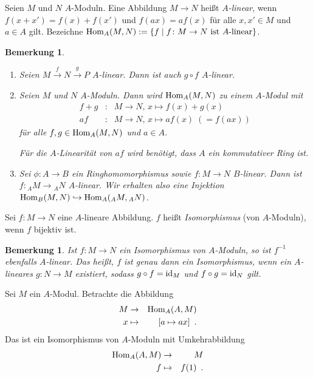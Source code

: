 \documentclass[12pt,a4paper]{scrartcl}
\theoremstyle{cplain}
\theoremstyle{cdef}
\newtheorem{beme}[thmcounter]{Bemerkung}
\begin{document}
\begin{defi}
Seien $M$ und $N$ $A$-Moduln. Eine Abbildung $M\rightarrow N$ heißt \emph{$A$-linear}, wenn $f(x+x')=f(x)+f(x')$ und $f(ax)=af(x)$ für alle $x,x'\in M$ und $a\in A$ gilt.
Bezeichne $\operatorname{Hom}_A(M, N) := \{f \mid  \text{$f\colon M\rightarrow N$ ist $A$-linear}\}$.
\end{defi}


\begin{beme}
	\leavevmode
	\begin{enumerate}
		\item Seien $M\xrightarrow{f}N\xrightarrow{g}P$ $A$-linear. Dann ist auch $g\circ f$ $A$-linear.
		\item Seien $M$ und $N$ $A$-Moduln. Dann wird $\operatorname{Hom}_A(M,N)$ zu einem $A$-Modul mit
		\begin{eqnarray*}
			f+g & \colon & M\to N,\, x\mapsto f(x) + g(x)\\
			af & \colon & M\to N,\, x\mapsto af(x)\; (= f(ax))
		\end{eqnarray*}
		für alle $f,g\in\operatorname{Hom}_A(M,N)$ und $a\in A$.
		
		Für die $A$-Linearität von $af$ wird benötigt, dass $A$ ein kommutativer Ring ist.
		\item Sei $\phi\colon A\to B$ ein Ringhomomorphismus sowie $f\colon M\to N$ $B$-linear. Dann ist $f\colon {}_AM\to {}_AN$ $A$-linear. Wir erhalten also eine Injektion $\operatorname{Hom}_B(M,N)\hookrightarrow \operatorname{Hom}_A({}_AM,{}_AN)$.
	\end{enumerate}
\end{beme}
\begin{defi}
	Sei $f\colon M\to N$ eine $A$-lineare Abbildung. $f$ heißt \emph{Isomorphismus} (von $A$-Moduln), wenn $f$ bijektiv ist.
\end{defi}
\begin{beme} Ist $f\colon M\to N$ ein Isomorphismus von $A$-Moduln, so ist $f^{-1}$ ebenfalls $A$-linear. Das heißt, $f$ ist genau dann ein Isomorphismus, wenn ein $A$-lineares $g\colon N\to M$ existiert, sodass $g\circ f = \operatorname{id}_M$ und $f\circ g = \operatorname{id}_N$ gilt.
\end{beme}
\begin{bsp}
	Sei $M$ ein $A$-Modul. Betrachte die Abbildung \begin{eqnarray*}
		M &\to& \operatorname{Hom}_A(A,M)\\
		x&\mapsto & [a\mapsto ax]\enspace .
	\end{eqnarray*}
	Das ist ein Isomorphismus von $A$-Moduln mit Umkehrabbildung
	\begin{eqnarray*}
		\operatorname{Hom}_A(A,M)&\to& M\\
		f &\mapsto& f(1) \enspace .
	\end{eqnarray*}
\end{bsp}
\end{document}
